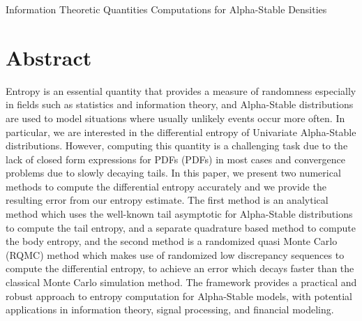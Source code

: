 \documentclass{article}
\theoremstyle{definition}
\begin{document}
\begin{center} 
  {\LARGE Information Theoretic Quantities Computations for Alpha-Stable Densities}\\[2ex]
\end{center}
\section*{Abstract}
Entropy is an essential quantity that provides a measure of randomness especially in fields such as statistics and information theory, and Alpha-Stable distributions are used to model situations where usually unlikely events occur more often. In particular, we are interested in the differential entropy of Univariate Alpha-Stable distributions. However, computing this quantity is a challenging task due to the lack of closed form expressions for PDFs (PDFs) in most cases and convergence problems due to slowly decaying tails. In this paper, we present two numerical methods to compute the differential entropy accurately and we provide the resulting error from our entropy estimate. The first method is an analytical method which uses the well-known tail asymptotic for Alpha-Stable distributions to compute the tail entropy, and a separate quadrature based method to compute the body entropy, and the second method is a randomized quasi Monte Carlo (RQMC) method which makes use of randomized low discrepancy sequences to compute the differential entropy, to achieve an error which decays faster than the classical Monte Carlo simulation method. The framework provides a practical and robust approach to entropy computation for Alpha-Stable models, with potential applications in information theory, signal processing, and financial modeling.   


\end{document}

